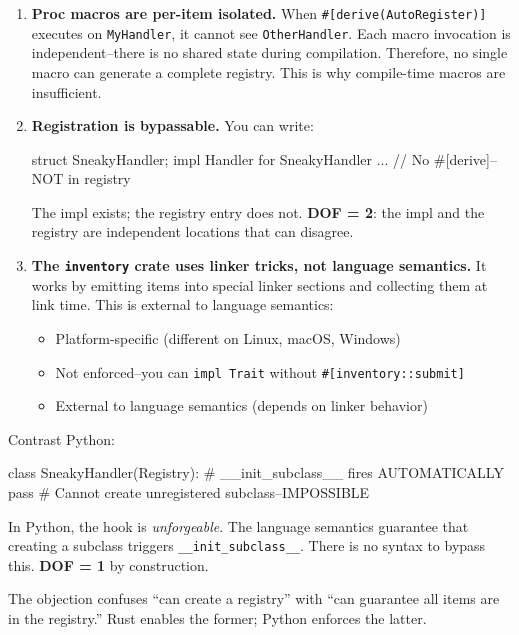 \begin{enumerate}
\item \textbf{Proc macros are per-item isolated.} When \texttt{\#[derive(AutoRegister)]} executes on \texttt{MyHandler}, it cannot see \texttt{OtherHandler}. Each macro invocation is independent--there is no shared state during compilation. Therefore, no single macro can generate a complete registry. This is why compile-time macros are insufficient. 

\item \textbf{Registration is bypassable.} You can write:
\begin{code}
struct SneakyHandler;
impl Handler for SneakyHandler { ... }  // No #[derive]--NOT in registry
\end{code}
The impl exists; the registry entry does not. \textbf{DOF = 2}: the impl and the registry are independent locations that can disagree. 

\item \textbf{The \texttt{inventory} crate uses linker tricks, not language semantics.} It works by emitting items into special linker sections and collecting them at link time. This is external to language semantics: 
\begin{itemize}
\tightlist
\item Platform-specific (different on Linux, macOS, Windows)
\item Not enforced--you can \texttt{impl Trait} without \texttt{\#[inventory::submit]}
\item External to language semantics (depends on linker behavior)
\end{itemize}
\end{enumerate}

Contrast Python:
\begin{code}
class SneakyHandler(Registry):  # __init_subclass__ fires AUTOMATICALLY
    pass  # Cannot create unregistered subclass--IMPOSSIBLE
\end{code}

In Python, the hook is \emph{unforgeable}. The language semantics guarantee that creating a subclass triggers \texttt{\_\_init\_subclass\_\_}. There is no syntax to bypass this. \textbf{DOF = 1} by construction.

The objection confuses ``can create a registry'' with ``can guarantee all items are in the registry.'' Rust enables the former; Python enforces the latter.


